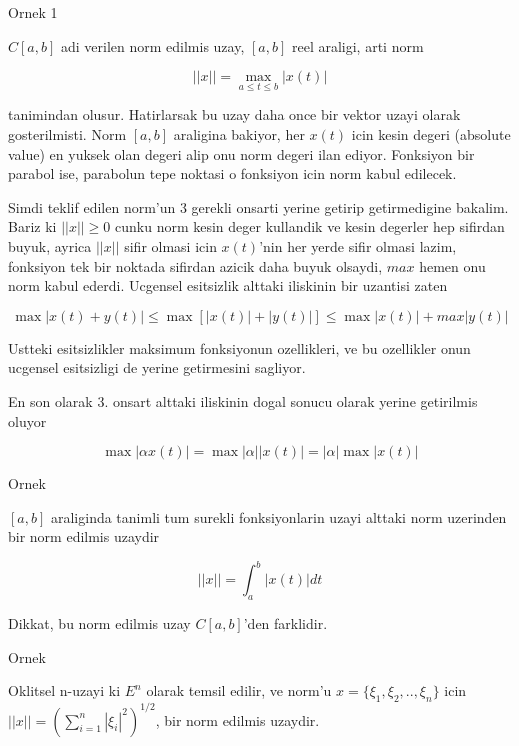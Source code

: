 \documentclass[12pt,fleqn]{article}
\begin{document}
Ornek 1

$C[a,b]$ adi verilen norm edilmis uzay, $[a,b]$ reel araligi, arti norm

\[ ||x|| = \max_{a \le t \le b} |x(t)| \]

tanimindan olusur. Hatirlarsak bu uzay daha once bir vektor uzayi olarak
gosterilmisti. Norm $[a,b]$ araligina bakiyor, her $x(t)$ icin kesin degeri
(absolute value) en yuksek olan degeri alip onu norm degeri ilan
ediyor. Fonksiyon bir parabol ise, parabolun tepe noktasi o fonksiyon icin
norm kabul edilecek. 

Simdi teklif edilen norm'un 3 gerekli onsarti yerine getirip getirmedigine
bakalim. Bariz ki $||x|| \ge 0$ cunku norm kesin deger kullandik ve kesin
degerler hep sifirdan buyuk, ayrica $||x||$ sifir olmasi icin $x(t)$'nin
her yerde sifir olmasi lazim, fonksiyon tek bir noktada sifirdan azicik
daha buyuk olsaydi, $max$ hemen onu norm kabul ederdi. Ucgensel esitsizlik
alttaki iliskinin bir uzantisi zaten

\[ 
\max |x(t) + y(t)| \le 
\max [|x(t)| + |y(t)|] \le
\max |x(t)| + max |y(t)|
\]

Ustteki esitsizlikler maksimum fonksiyonun ozellikleri, ve bu ozellikler
onun ucgensel esitsizligi de yerine getirmesini sagliyor. 

En son olarak 3. onsart alttaki iliskinin dogal sonucu olarak yerine
getirilmis oluyor 

\[ \max |\alpha x(t)|  = \max |\alpha||x(t)| = |\alpha| \max |x(t)|  \]

Ornek

$[a,b]$ araliginda tanimli tum surekli fonksiyonlarin uzayi alttaki norm
uzerinden bir norm edilmis uzaydir

\[ ||x|| = \int _{ a}^{b} |x(t)|dt \]

Dikkat, bu norm edilmis uzay $C[a,b]$'den farklidir. 

Ornek 

Oklitsel n-uzayi ki $E^n$ olarak temsil edilir, ve norm'u $x = \{ \xi_1,
\xi_2, .., \xi_n\}$ 
icin $||x|| = (\sum _{ i=1}^{n} |\xi_i|^2)^{1/2}$, bir norm edilmis uzaydir. 
\end{document}
